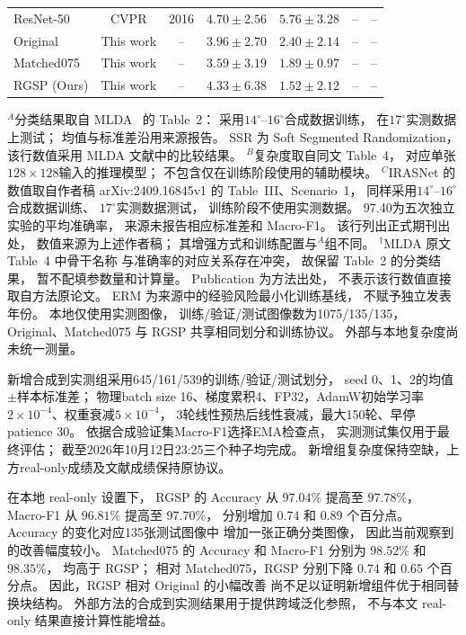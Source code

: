\begin{table}[!t]
\begin{tabular*}{\textwidth}{@{\extracolsep{\fill}}lccrrrr}
ResNet-50
& CVPR & 2016
& $\mathbf{4.70\pm2.56}$ & $\mathbf{5.76\pm3.28}$ & -- & -- \\
Original
& This work & --
& $3.96\pm2.70$ & $2.40\pm2.14$ & -- & -- \\
Matched075
& This work & --
& $3.59\pm3.19$ & $1.89\pm0.97$ & -- & -- \\
RGSP (Ours)
& This work & --
& $4.33\pm6.38$ & $1.52\pm2.12$ & -- & -- \\
\bottomrule
\end{tabular*}
\smallskip
\begin{minipage}{\linewidth}
\footnotesize
$^{A}$分类结果取自 MLDA~\cite{mlda2025} 的 Table~2：
采用$14^\circ$--$16^\circ$合成数据训练，
在$17^\circ$实测数据上测试；
均值与标准差沿用来源报告。
SSR 为 Soft Segmented Randomization，
该行数值采用 MLDA 文献中的比较结果。
$^{B}$复杂度取自同文 Table~4，
对应单张$128\times128$输入的推理模型；
不包含仅在训练阶段使用的辅助模块。
$^{C}$IRASNet 的数值取自作者稿
arXiv:2409.16845v1 的 Table~III、Scenario~1，
同样采用$14^\circ$--$16^\circ$合成数据训练、
$17^\circ$实测数据测试，
训练阶段不使用实测数据。
97.40为五次独立实验的平均准确率，
来源未报告相应标准差和 Macro-F1。
该行列出正式期刊出处，
数值来源为上述作者稿；
其增强方式和训练配置与$^{A}$组不同。
$^{\dagger}$MLDA 原文 Table~4 中骨干名称
与准确率的对应关系存在冲突，
故保留 Table~2 的分类结果，
暂不配填参数量和计算量。
Publication 为方法出处，
不表示该行数值直接取自方法原论文。
ERM 为来源中的经验风险最小化训练基线，
不赋予独立发表年份。
本地仅使用实测图像，
训练/验证/测试图像数为1075/135/135，
Original、Matched075 与 RGSP
共享相同划分和训练协议。
外部与本地复杂度尚未统一测量。

新增合成到实测组采用645/161/539的训练/验证/测试划分，
seed 0、1、2的均值$\pm$样本标准差；
物理batch size 16、梯度累积4、FP32，AdamW初始学习率
$2\times10^{-4}$、权重衰减$5\times10^{-4}$，
3轮线性预热后线性衰减，最大150轮、早停patience 30。
依据合成验证集Macro-F1选择EMA检查点，
实测测试集仅用于最终评估；
截至2026年10月12日23:25三个种子均完成。
新增组复杂度保持空缺，上方real-only成绩及文献成绩保持原协议。
\end{minipage}
\end{table}

在本地 real-only 设置下，
RGSP 的 Accuracy 从 $97.04\%$ 提高至 $97.78\%$，
Macro-F1 从 $96.81\%$ 提高至 $97.70\%$，
分别增加 $0.74$ 和 $0.89$ 个百分点。
Accuracy 的变化对应135张测试图像中
增加一张正确分类图像，
因此当前观察到的改善幅度较小。
Matched075 的 Accuracy 和 Macro-F1
分别为 $98.52\%$ 和 $98.35\%$，
均高于 RGSP；
相对 Matched075，RGSP 分别下降
$0.74$ 和 $0.65$ 个百分点。
因此，RGSP 相对 Original 的小幅改善
尚不足以证明新增组件优于相同替换块结构。
外部方法的合成到实测结果用于提供跨域泛化参照，
不与本文 real-only 结果直接计算性能增益。

